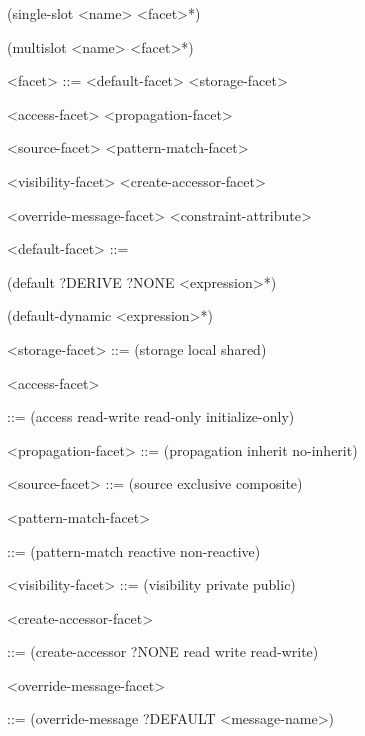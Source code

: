\documentclass[letterpaper,10pt,english]{sphinxmanual}
\begin{document}
(single-slot \textless{}name\textgreater{} \textless{}facet\textgreater{}*) \textbar{}

(multislot \textless{}name\textgreater{} \textless{}facet\textgreater{}*)

\textless{}facet\textgreater{} ::= \textless{}default-facet\textgreater{} \textbar{} \textless{}storage-facet\textgreater{} \textbar{}

\textless{}access-facet\textgreater{} \textbar{} \textless{}propagation-facet\textgreater{} \textbar{}

\textless{}source-facet\textgreater{} \textbar{} \textless{}pattern-match-facet\textgreater{} \textbar{}

\textless{}visibility-facet\textgreater{} \textbar{} \textless{}create-accessor-facet\textgreater{}

\textless{}override-message-facet\textgreater{} \textbar{} \textless{}constraint-attribute\textgreater{}

\textless{}default-facet\textgreater{} ::=

(default ?DERIVE \textbar{} ?NONE \textbar{} \textless{}expression\textgreater{}*) \textbar{}

(default-dynamic \textless{}expression\textgreater{}*)

\textless{}storage-facet\textgreater{} ::= (storage local \textbar{} shared)

\textless{}access-facet\textgreater{}

::= (access read-write \textbar{} read-only \textbar{} initialize-only)

\textless{}propagation-facet\textgreater{} ::= (propagation inherit \textbar{} no-inherit)

\textless{}source-facet\textgreater{} ::= (source exclusive \textbar{} composite)

\textless{}pattern-match-facet\textgreater{}

::= (pattern-match reactive \textbar{} non-reactive)

\textless{}visibility-facet\textgreater{} ::= (visibility private \textbar{} public)

\textless{}create-accessor-facet\textgreater{}

::= (create-accessor ?NONE \textbar{} read \textbar{} write \textbar{} read-write)

\textless{}override-message-facet\textgreater{}

::= (override-message ?DEFAULT \textbar{} \textless{}message-name\textgreater{})
\end{document}
